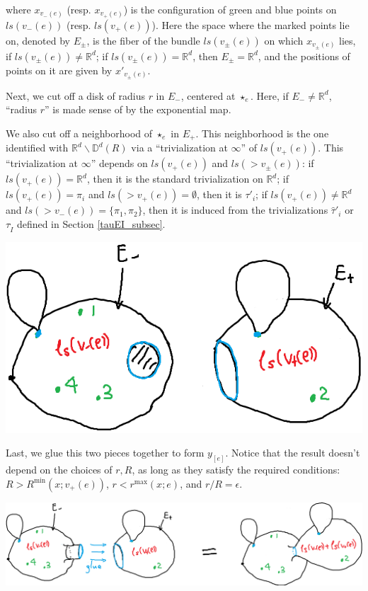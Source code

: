 \documentclass[11pt]{article}
\theoremstyle{definition}
\theoremstyle{remark}
\def\R{\mathbb{R}}
\def\D{\mathbb{D}}
\def\rI{{\mathring{I}}}
\begin{document}
where $x_{v_-(e)}$ (resp. $x_{v_+(e)}$) is the configuration of green and blue points on $ls(v_-(e))$ (resp. $ls(v_+(e))$). 
Here the space where the marked points lie on, denoted by $E_\pm$, is the fiber of the bundle $ls(v_\pm(e))$ on which $x_{v_\pm(e)}$ lies, if $ls(v_\pm(e))\neq\R^d$; if $ls(v_{\pm}(e))=\R^d$, then $E_\pm=\R^d$, and the positions of points on it are given by $x'_{v_\pm(e)}$. 

Next, we cut off a disk of radius $r$ in $E_-$, centered at $\star_e$. Here, if $E_-\neq\R^d$, ``radius $r$'' is made sense of by the exponential map. 

We also cut off a neighborhood of $\star_e$ in $E_+$. This neighborhood is the one identified with $\R^d\backslash\D^d(R)$ via a ``trivialization at $\infty$'' of $ls(v_+(e))$. This ``trivialization at $\infty$'' depends on $ls(v_+(e))$ and $ls(>v_\pm(e))$: if $ls(v_+(e))=\R^d$, then it is the standard trivialization on $\R^d$; if $ls(v_+(e))=\pi_i$ and $ls(>v_+(e))=\emptyset$, then it is $\tau'_i$; if $ls(v_+(e))\neq\R^d$ and $ls(>v_-(e))=\{\pi_1,\pi_2\}$, then it is induced from the trivializations $\hat\tau'_i$ or $\tau_\rI$ defined in Section \ref{tauEI_subsec}. 

\includegraphics[scale=0.5]{yedfn2_fig}

Last, we glue this two pieces together to form $y_{[e]}$. Notice that the result doesn't depend on the choices of $r,R$, as long as they satisfy the required conditions:
$R>R^{\min}(x;v_+(e))$, $r<r^{\max}(x;e)$, and $r/R=\epsilon$. 

\includegraphics[scale=0.5]{yedfn3_fig}
\end{document}
